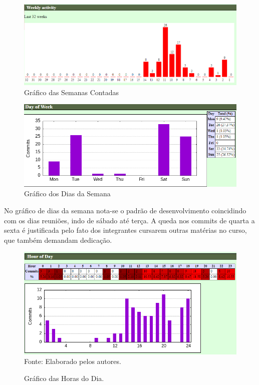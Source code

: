 \documentclass[
    12pt,               %
    openright,          %
    oneside,
    a4paper,            %
    BIBLATEX,           %
    TODO,               %
    english,            %
    brazil              %
    ]{ifsp-spo-inf-ctds}
\begin{document}
    
      \begin{figure}[H]
                \centering
                \includegraphics[width=1 \textwidth]{Gitstats/documento/semanas contadas.png}
                \caption{Gráfico das Semanas Contadas}
                \label{fig:semanas contadas}
            \end{figure}
    
      \begin{figure}[H]
                \centering
                \includegraphics[width=1 \textwidth]{Gitstats/documento/dias da semana.png}
                \caption{Gráfico dos Dias da Semana}
                \label{fig:diadasemana}
            \end{figure}
    
    No gráfico de dias da semana nota-se o padrão de desenvolvimento coincidindo com os dias reuniões, indo de sábado até terça. A queda nos commits de quarta a sexta é justificada pelo fato dos integrantes cursarem outras matérias no curso, que também demandam dedicação.
    
      \begin{figure}[H]
                \centering
                \caption{Gráfico das Horas do Dia.}
                \includegraphics[width=1 \textwidth]{Gitstats/documento/horasdodia.png}
                {\footnotesize Fonte: Elaborado pelos autores.}
                \label{fig:horadodia}
            \end{figure}
            
\end{document}
